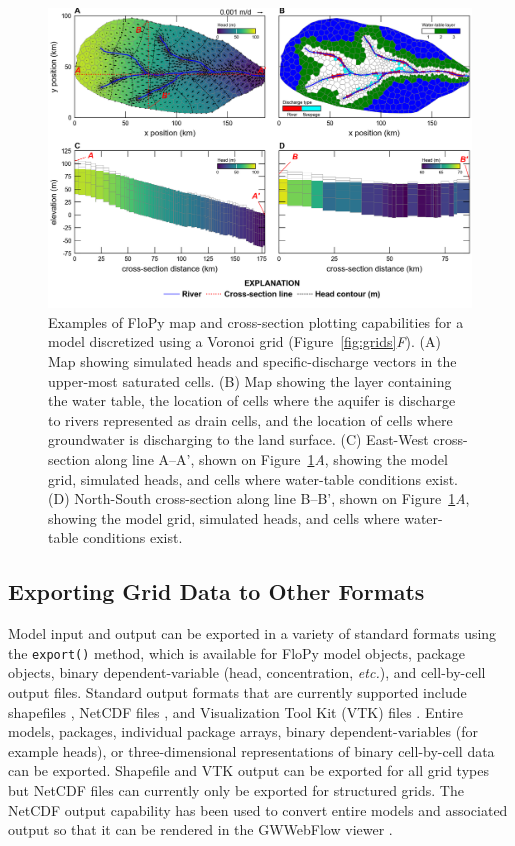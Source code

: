 \documentclass[11pt, oneside]{article}  	%
\begin{document}
\begin{figure}[ht!]
	\begin{center}
		\includegraphics{figures/grids_flopy_plots.png}
	\end{center}
	\caption{Examples of FloPy map and cross-section plotting capabilities for a model discretized using a Voronoi grid (Figure~\ref{fig:grids}\textit{F}). (A) Map showing simulated heads and specific-discharge vectors in the upper-most saturated cells. (B) Map showing the layer containing the water table, the location of cells where the aquifer is discharge to rivers represented as drain cells, and the location of cells where groundwater is discharging to the land surface. (C) East-West cross-section along line A--A', shown on Figure~\ref{fig:flopyplots}\textit{A}, showing the model grid, simulated heads, and cells where water-table conditions exist. (D) North-South cross-section along line B--B', shown on Figure~\ref{fig:flopyplots}\textit{A}, showing the model grid, simulated heads, and cells where water-table conditions exist.}
	\label{fig:flopyplots}
\end{figure}

\subsection{Exporting Grid Data to Other Formats}

Model input and output can be exported in a variety of standard formats using the \texttt{export()} method, which is available for FloPy model objects, package objects, binary dependent-variable (head, concentration, \textit{etc.}), and cell-by-cell output files. Standard output formats that are currently supported include shapefiles \citep{environmental1998esri}, NetCDF files \citep{rew2006netcdf, rew1990netcdf}, and Visualization Tool Kit (VTK) files \citep{schroeder:2006:VTK}. Entire models, packages, individual package arrays, binary dependent-variables (for example heads), or three-dimensional representations of binary cell-by-cell data can be exported. Shapefile and VTK output can be exported for all grid types but NetCDF files can currently only be exported for structured grids. The NetCDF output capability has been used to convert entire models and associated output so that it can be rendered in the GWWebFlow viewer \citep{gswebflow2018}.
\end{document}
